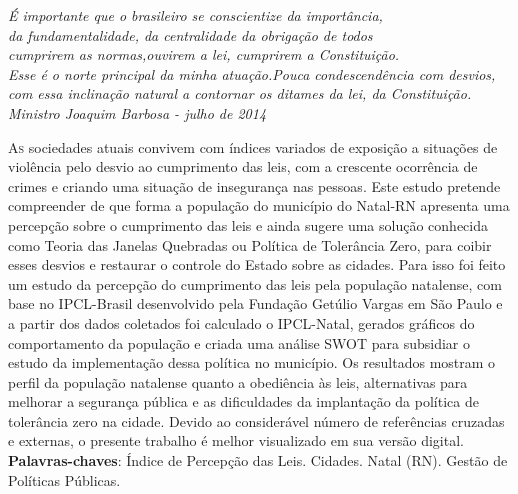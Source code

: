 \documentclass[
	12pt,				%
	openright,			%
	twoside,			%
	a4paper,			%
	chapter=TITLE,		%
	section=TITLE,		%
	subsection=TITLE,	%
	subsubsection=TITLE,%
	spanish,            %
	english,			%
	brazil				%
	]{abntex2}
\begin{document}
\begin{epigrafe}
    \vspace*{\fill}
	\begin{flushright}
		\textit{É importante que o brasileiro se conscientize da importância,\\ 
		da fundamentalidade, da centralidade da obrigação de todos\\ cumprirem as normas,ouvirem a lei, cumprirem a Constituição.\\ Esse é o norte principal da minha atuação.Pouca condescendência com desvios,\\ com essa inclinação natural a contornar os ditames da lei, da Constituição.\\ 
		Ministro Joaquim Barbosa - julho de 2014}
	\end{flushright}
\end{epigrafe}


%
\setlength{\absparsep}{18pt} %
\begin{resumo}
 \lettrine[lines=2, lhang=0.33, loversize=0.25]{A} {s} sociedades atuais convivem com índices variados de exposição a situações de violência pelo desvio ao cumprimento das leis, com a crescente ocorrência de crimes e criando uma situação de insegurança nas pessoas. Este estudo pretende compreender de que forma a população do município do Natal-RN apresenta uma percepção sobre o cumprimento das leis e ainda sugere uma solução conhecida como Teoria das Janelas Quebradas ou Política de Tolerância Zero, para coibir esses desvios e restaurar o controle do Estado sobre as cidades. Para isso foi feito um estudo da percepção do cumprimento das leis pela população natalense, com base no IPCL-Brasil desenvolvido pela Fundação Getúlio Vargas
 em São Paulo e a partir dos dados coletados foi
 calculado o IPCL-Natal, gerados gráficos do comportamento da população e criada uma análise SWOT para subsidiar o estudo da implementação dessa política no município. Os resultados mostram o perfil da população natalense quanto a obediência às leis, alternativas para melhorar a segurança pública e as dificuldades da implantação da política de tolerância zero na cidade. Devido ao considerável número de referências cruzadas e externas, o presente trabalho é melhor visualizado em sua versão digital.\\
 \textbf{Palavras-chaves}: Índice de Percepção das Leis. Cidades. Natal (RN). Gestão de Políticas Públicas.
\end{resumo}
\end{document}
